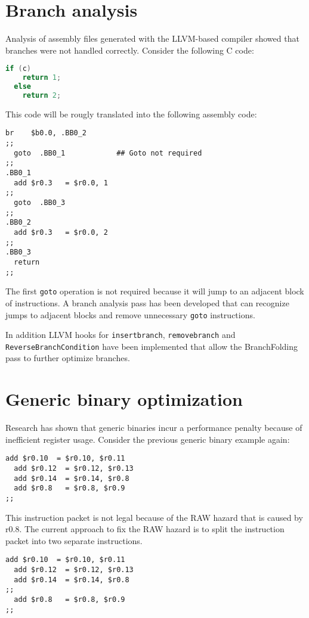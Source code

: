 \section{Branch analysis}
Analysis of assembly files generated with the LLVM-based compiler showed that branches were not handled correctly. Consider the following C code:

\begin{lstlisting}[language=c]
  if (c)
    return 1;
  else
    return 2;
\end{lstlisting}

This code will be rougly translated into the following assembly code:

\begin{lstlisting}[language=rvex]
  br    $b0.0, .BB0_2
;;
  goto  .BB0_1            ## Goto not required
;;
.BB0_1
  add $r0.3   = $r0.0, 1
;;
  goto  .BB0_3
;;
.BB0_2
  add $r0.3   = $r0.0, 2
;;
.BB0_3
  return
;;
\end{lstlisting}

The first \texttt{goto} operation is not required because it will jump to an adjacent block of instructions. A branch analysis pass has been developed that can recognize jumps to adjacent blocks and remove unnecessary \texttt{goto} instructions.

In addition LLVM hooks for \texttt{insertbranch}, \texttt{removebranch} and \texttt{ ReverseBranchCondition} have been implemented that allow the BranchFolding pass to further optimize branches.


\section{Generic binary optimization}
Research \cite{Anthony-Brandon:2013jk} has shown  that generic binaries incur a performance penalty because of inefficient register usage. Consider the previous generic binary example again:

\begin{lstlisting}[language=rvex]
  add $r0.10  = $r0.10, $r0.11
  add $r0.12  = $r0.12, $r0.13
  add $r0.14  = $r0.14, $r0.8
  add $r0.8   = $r0.8, $r0.9
;; 
\end{lstlisting}

This instruction packet is not legal because of the RAW hazard that is caused by r0.8. The current approach to fix the RAW hazard is to split the instruction packet into two separate instructions. 

\begin{lstlisting}[language=rvex]
  add $r0.10  = $r0.10, $r0.11
  add $r0.12  = $r0.12, $r0.13
  add $r0.14  = $r0.14, $r0.8
;;
  add $r0.8   = $r0.8, $r0.9
;;
\end{lstlisting}

